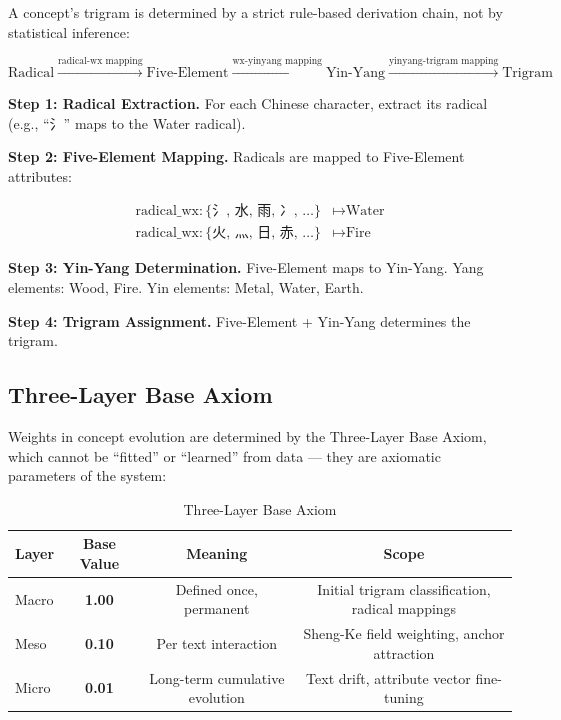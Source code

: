\documentclass[11pt,a4paper]{article}
\begin{document}
A concept's trigram is determined by a strict rule-based derivation chain, not by statistical inference:

\[
\text{Radical} \xrightarrow{\text{radical-wx mapping}} \text{Five-Element} \xrightarrow{\text{wx-yinyang mapping}} \text{Yin-Yang} \xrightarrow{\text{yinyang-trigram mapping}} \text{Trigram}
\]

\textbf{Step 1: Radical Extraction.} For each Chinese character, extract its radical (e.g., ``氵'' maps to the Water radical).

\textbf{Step 2: Five-Element Mapping.} Radicals are mapped to Five-Element attributes:

\begin{align*}
\text{radical\_wx}: \{\text{氵, 水, 雨, 冫, \ldots}\} &\mapsto \text{Water} \\
\text{radical\_wx}: \{\text{火, 灬, 日, 赤, \ldots}\} &\mapsto \text{Fire}
\end{align*}

\textbf{Step 3: Yin-Yang Determination.} Five-Element maps to Yin-Yang. Yang elements: Wood, Fire. Yin elements: Metal, Water, Earth.

\textbf{Step 4: Trigram Assignment.} Five-Element + Yin-Yang determines the trigram.

\subsection{Three-Layer Base Axiom}

Weights in concept evolution are determined by the Three-Layer Base Axiom, which cannot be ``fitted'' or ``learned'' from data — they are axiomatic parameters of the system:

\begin{table}[ht]
\centering
\caption{Three-Layer Base Axiom}
\begin{tabular}{lccc}
\toprule
Layer & Base Value & Meaning & Scope \\
\midrule
Macro  & \textbf{1.00} & Defined once, permanent & Initial trigram classification, radical mappings \\
Meso   & \textbf{0.10} & Per text interaction & Sheng-Ke field weighting, anchor attraction \\
Micro  & \textbf{0.01} & Long-term cumulative evolution & Text drift, attribute vector fine-tuning \\
\bottomrule
\end{tabular}
\end{table}
\end{document}

